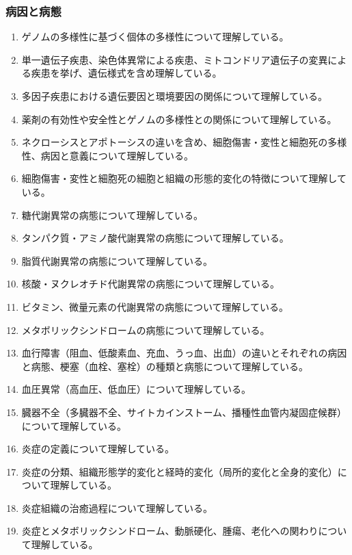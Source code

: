 \hypertarget{ux75c5ux56e0ux3068ux75c5ux614b}{%
\subsubsection{病因と病態}\label{ux75c5ux56e0ux3068ux75c5ux614b}}

\begin{enumerate}
\def\labelenumi{\arabic{enumi}.}
\tightlist
\item
  ゲノムの多様性に基づく個体の多様性について理解している。
\item
  単一遺伝子疾患、染色体異常による疾患、ミトコンドリア遺伝子の変異による疾患を挙げ、遺伝様式を含め理解している。
\item
  多因子疾患における遺伝要因と環境要因の関係について理解している。
\item
  薬剤の有効性や安全性とゲノムの多様性との関係について理解している。
\item
  ネクローシスとアポトーシスの違いを含め、細胞傷害・変性と細胞死の多様性、病因と意義について理解している。
\item
  細胞傷害・変性と細胞死の細胞と組織の形態的変化の特徴について理解している。
\item
  糖代謝異常の病態について理解している。
\item
  タンパク質・アミノ酸代謝異常の病態について理解している。
\item
  脂質代謝異常の病態について理解している。
\item
  核酸・ヌクレオチド代謝異常の病態について理解している。
\item
  ビタミン、微量元素の代謝異常の病態について理解している。
\item
  メタボリックシンドロームの病態について理解している。
\item
  血行障害（阻血、低酸素血、充血、うっ血、出血）の違いとそれぞれの病因と病態、梗塞（血栓、塞栓）の種類と病態について理解している。
\item
  血圧異常（高血圧、低血圧）について理解している。
\item
  臓器不全（多臓器不全、サイトカインストーム、播種性血管内凝固症候群）について理解している。
\item
  炎症の定義について理解している。
\item
  炎症の分類、組織形態学的変化と経時的変化（局所的変化と全身的変化）について理解している。
\item
  炎症組織の治癒過程について理解している。
\item
  炎症とメタボリックシンドローム、動脈硬化、腫瘍、老化への関わりについて理解している。

\end{enumerate}
